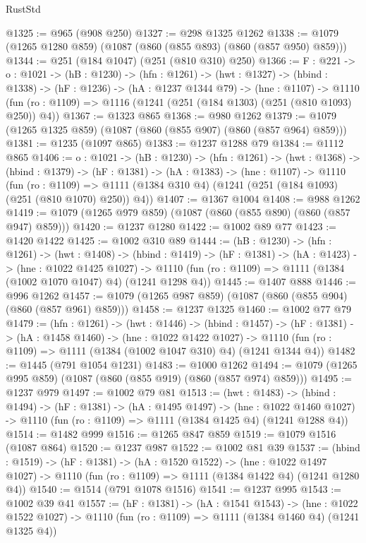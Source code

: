 \begin{lexlean}{RustStd}
\begin{coremodule}
{\begin{coremodule}
{@1325 := @965 (@908 @250)
@1327 := @298 @1325 @1262
@1338 := @1079 (@1265 @1280 @859) (@1087 (@860 (@855 @893) (@860 (@857 @950) @859)))
@1344 := @251 (@184 @1047) (@251 (@810 @310) @250)
@1366 := {F : @221} ->
  {o : @1021} ->
  (hB : @1230) ->
  (hfn : @1261) ->
  (hwt : @1327) ->
  (hbind : @1338) ->
  (hF : @1236) ->
  (hA : @1237 @1344 @79) ->
  (hne : @1107) ->
  @1110 (fun (ro : @1109) => @1116 (@1241 (@251 (@184 @1303) (@251 (@810 @1093) @250)) @4))
@1367 := @1323 @865
@1368 := @980 @1262
@1379 := @1079 (@1265 @1325 @859) (@1087 (@860 (@855 @907) (@860 (@857 @964) @859)))
@1381 := @1235 (@1097 @865)
@1383 := @1237 @1288 @79
@1384 := @1112 @865
@1406 := {o : @1021} ->
  (hB : @1230) ->
  (hfn : @1261) ->
  (hwt : @1368) ->
  (hbind : @1379) ->
  (hF : @1381) ->
  (hA : @1383) ->
  (hne : @1107) ->
  @1110
    (fun (ro : @1109) =>
    @1111 (@1384 @310 @4) (@1241 (@251 (@184 @1093) (@251 (@810 @1070) @250)) @4))
@1407 := @1367 @1004
@1408 := @988 @1262
@1419 := @1079 (@1265 @979 @859) (@1087 (@860 (@855 @890) (@860 (@857 @947) @859)))
@1420 := @1237 @1280
@1422 := @1002 @89 @77
@1423 := @1420 @1422
@1425 := @1002 @310 @89
@1444 := (hB : @1230) ->
  (hfn : @1261) ->
  (hwt : @1408) ->
  (hbind : @1419) ->
  (hF : @1381) ->
  (hA : @1423) ->
  (hne : @1022 @1425 @1027) ->
  @1110 (fun (ro : @1109) => @1111 (@1384 (@1002 @1070 @1047) @4) (@1241 @1298 @4))
@1445 := @1407 @888
@1446 := @996 @1262
@1457 := @1079 (@1265 @987 @859) (@1087 (@860 (@855 @904) (@860 (@857 @961) @859)))
@1458 := @1237 @1325
@1460 := @1002 @77 @79
@1479 := (hfn : @1261) ->
  (hwt : @1446) ->
  (hbind : @1457) ->
  (hF : @1381) ->
  (hA : @1458 @1460) ->
  (hne : @1022 @1422 @1027) ->
  @1110 (fun (ro : @1109) => @1111 (@1384 (@1002 @1047 @310) @4) (@1241 @1344 @4))
@1482 := @1445 (@791 @1054 @1231)
@1483 := @1000 @1262
@1494 := @1079 (@1265 @995 @859) (@1087 (@860 (@855 @919) (@860 (@857 @974) @859)))
@1495 := @1237 @979
@1497 := @1002 @79 @81
@1513 := (hwt : @1483) ->
  (hbind : @1494) ->
  (hF : @1381) ->
  (hA : @1495 @1497) ->
  (hne : @1022 @1460 @1027) -> @1110 (fun (ro : @1109) => @1111 (@1384 @1425 @4) (@1241 @1288 @4))
@1514 := @1482 @999
@1516 := @1265 @847 @859
@1519 := @1079 @1516 (@1087 @864)
@1520 := @1237 @987
@1522 := @1002 @81 @39
@1537 := (hbind : @1519) ->
  (hF : @1381) ->
  (hA : @1520 @1522) ->
  (hne : @1022 @1497 @1027) -> @1110 (fun (ro : @1109) => @1111 (@1384 @1422 @4) (@1241 @1280 @4))
@1540 := @1514 (@791 @1078 @1516)
@1541 := @1237 @995
@1543 := @1002 @39 @41
@1557 := (hF : @1381) ->
  (hA : @1541 @1543) ->
  (hne : @1022 @1522 @1027) -> @1110 (fun (ro : @1109) => @1111 (@1384 @1460 @4) (@1241 @1325 @4))
}
\end{coremodule}}
\end{coremodule}
\end{lexlean}
